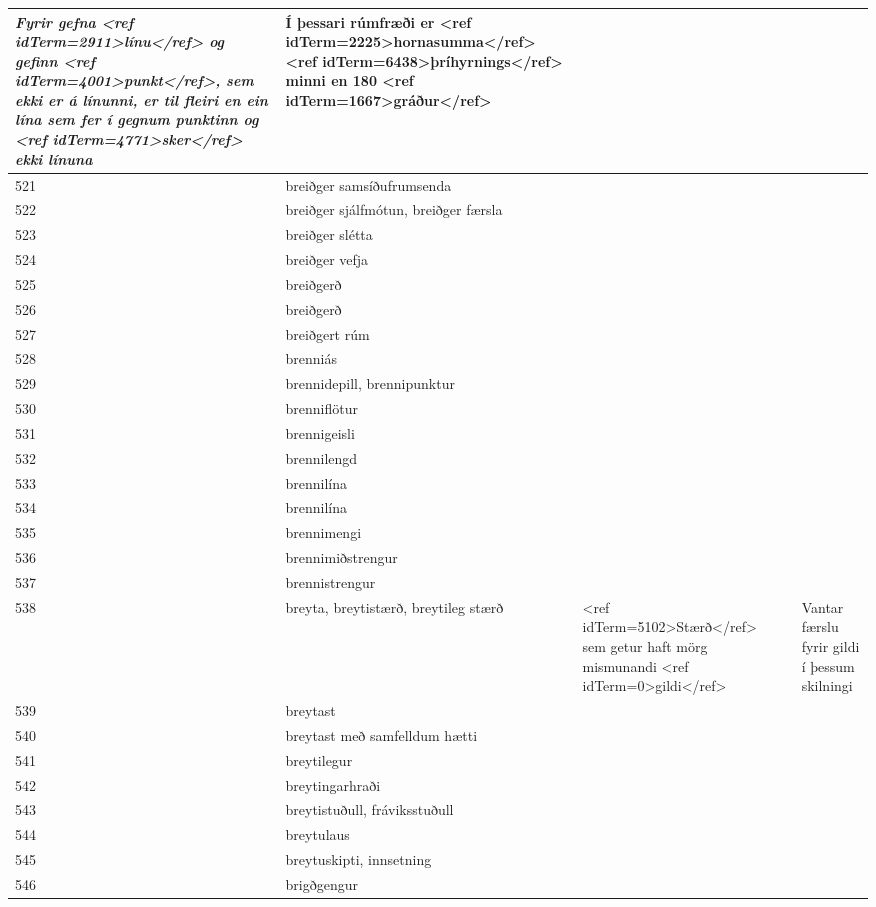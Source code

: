 \begin{longtable}{p{}|p{}|p{}|p{}|p{}}
\textit{Fyrir gefna <ref idTerm=2911>línu</ref> og gefinn <ref idTerm=4001>punkt</ref>,
sem ekki er á línunni, er til fleiri en ein lína sem fer í gegnum punktinn og <ref idTerm=4771>sker</ref> ekki línuna} & Í þessari rúmfræði er <ref idTerm=2225>hornasumma</ref> <ref idTerm=6438>þríhyrnings</ref> minni en 180 <ref idTerm=1667>gráður</ref> &  \\
\hline
521 & breiðger samsíðufrumsenda &  &  &  \\
\hline
522 & breiðger sjálfmótun, breiðger færsla &  &  &  \\
\hline
523 & breiðger slétta &  &  &  \\
\hline
524 & breiðger vefja &  &  &  \\
\hline
525 & breiðgerð &  &  &  \\
\hline
526 & breiðgerð &  &  &  \\
\hline
527 & breiðgert rúm &  &  &  \\
\hline
528 & brenniás &  &  &  \\
\hline
529 & brennidepill, brennipunktur &  &  &  \\
\hline
530 & brenniflötur &  &  &  \\
\hline
531 & brennigeisli &  &  &  \\
\hline
532 & brennilengd &  &  &  \\
\hline
533 & brennilína &  &  &  \\
\hline
534 & brennilína &  &  &  \\
\hline
535 & brennimengi &  &  &  \\
\hline
536 & brennimiðstrengur &  &  &  \\
\hline
537 & brennistrengur &  &  &  \\
\hline
538 & breyta, breytistærð, breytileg stærð & <ref idTerm=5102>Stærð</ref> sem getur haft mörg mismunandi <ref idTerm=0>gildi</ref> &  & Vantar færslu fyrir gildi í þessum skilningi \\
\hline
539 & breytast &  &  &  \\
\hline
540 & breytast með samfelldum hætti &  &  &  \\
\hline
541 & breytilegur &  &  &  \\
\hline
542 & breytingarhraði &  &  &  \\
\hline
543 & breytistuðull, fráviksstuðull &  &  &  \\
\hline
544 & breytulaus &  &  &  \\
\hline
545 & breytuskipti, innsetning &  &  &  \\
\hline
546 & brigðgengur &  &  &  \\

\end{longtable}
